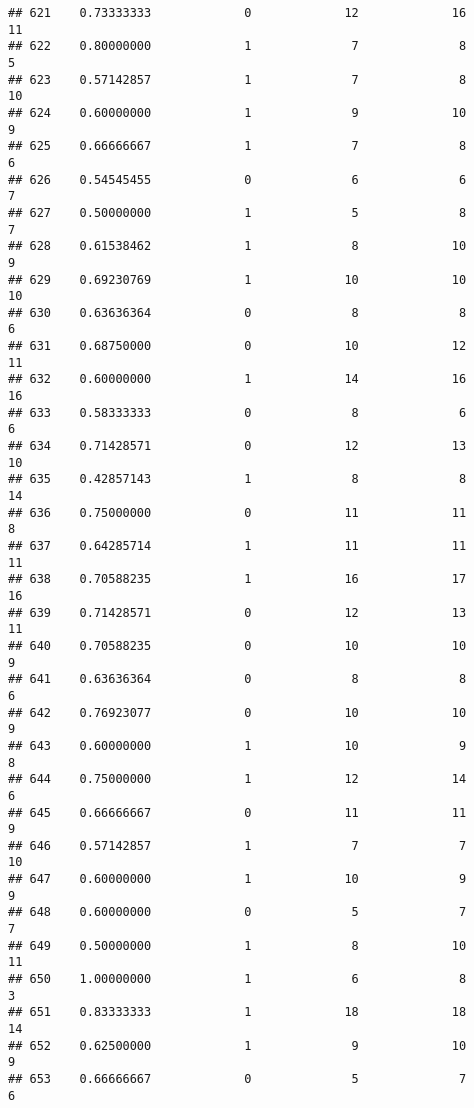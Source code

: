\documentclass[
]{article}
\begin{document}
\begin{verbatim}
## 621    0.73333333             0             12             16             11
## 622    0.80000000             1              7              8              5
## 623    0.57142857             1              7              8             10
## 624    0.60000000             1              9             10              9
## 625    0.66666667             1              7              8              6
## 626    0.54545455             0              6              6              7
## 627    0.50000000             1              5              8              7
## 628    0.61538462             1              8             10              9
## 629    0.69230769             1             10             10             10
## 630    0.63636364             0              8              8              6
## 631    0.68750000             0             10             12             11
## 632    0.60000000             1             14             16             16
## 633    0.58333333             0              8              6              6
## 634    0.71428571             0             12             13             10
## 635    0.42857143             1              8              8             14
## 636    0.75000000             0             11             11              8
## 637    0.64285714             1             11             11             11
## 638    0.70588235             1             16             17             16
## 639    0.71428571             0             12             13             11
## 640    0.70588235             0             10             10              9
## 641    0.63636364             0              8              8              6
## 642    0.76923077             0             10             10              9
## 643    0.60000000             1             10              9              8
## 644    0.75000000             1             12             14              6
## 645    0.66666667             0             11             11              9
## 646    0.57142857             1              7              7             10
## 647    0.60000000             1             10              9              9
## 648    0.60000000             0              5              7              7
## 649    0.50000000             1              8             10             11
## 650    1.00000000             1              6              8              3
## 651    0.83333333             1             18             18             14
## 652    0.62500000             1              9             10              9
## 653    0.66666667             0              5              7              6

\end{verbatim}
\end{document}

